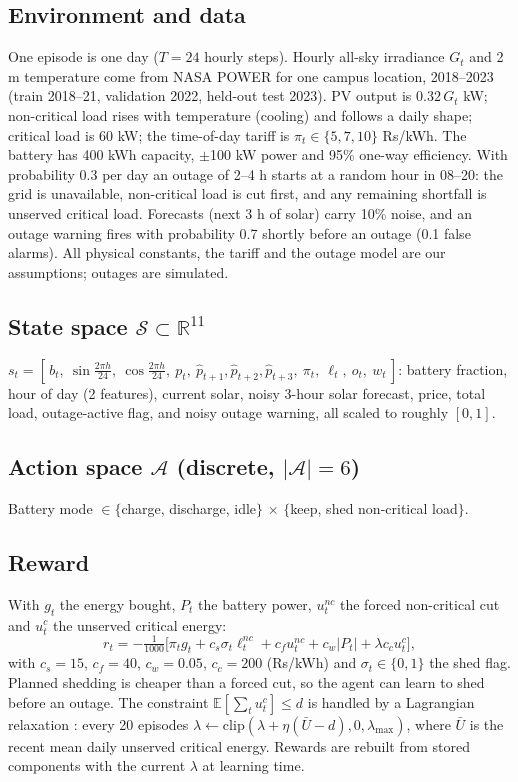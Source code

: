 ﻿\documentclass[10pt,twocolumn]{article}
\begin{document}
\subsection{Environment and data}
One episode is one day ($T{=}24$ hourly steps). Hourly all-sky irradiance $G_t$ and 2\,m temperature come from NASA POWER \cite{power} for one campus location, 2018--2023 (train 2018--21, validation 2022, held-out test 2023). PV output is $0.32\,G_t$ kW; non-critical load rises with temperature (cooling) and follows a daily shape; critical load is 60 kW; the time-of-day tariff is $\pi_t\in\{5,7,10\}$ Rs/kWh. The battery has 400 kWh capacity, $\pm$100 kW power and 95\% one-way efficiency. With probability 0.3 per day an outage of 2--4 h starts at a random hour in 08--20: the grid is unavailable, non-critical load is cut first, and any remaining shortfall is unserved critical load. Forecasts (next 3 h of solar) carry 10\% noise, and an outage warning fires with probability 0.7 shortly before an outage (0.1 false alarms). All physical constants, the tariff and the outage model are our assumptions; outages are simulated.

\subsection{State space $\mathcal S\subset\mathbb R^{11}$}
$s_t=[\,b_t,\ \sin\tfrac{2\pi h}{24},\ \cos\tfrac{2\pi h}{24},\ p_t,\ \hat p_{t+1},\hat p_{t+2},\hat p_{t+3},\ \pi_t,\ \ell_t,\ o_t,\ w_t\,]$: battery fraction, hour of day (2 features), current solar, noisy 3-hour solar forecast, price, total load, outage-active flag, and noisy outage warning, all scaled to roughly $[0,1]$.

\subsection{Action space $\mathcal A$ (discrete, $|\mathcal A|{=}6$)}
Battery mode $\in\{$charge, discharge, idle$\}$ $\times$ $\{$keep, shed non-critical load$\}$.

\subsection{Reward}
With $g_t$ the energy bought, $P_t$ the battery power, $u^{nc}_t$ the forced non-critical cut and $u^{c}_t$ the unserved critical energy:
\begin{equation}
r_t=-\tfrac{1}{1000}\big[\pi_t g_t + c_s\sigma_t \ell^{nc}_t + c_f u^{nc}_t + c_w|P_t| + \lambda c_c u^{c}_t\big],
\end{equation}
with $c_s{=}15$, $c_f{=}40$, $c_w{=}0.05$, $c_c{=}200$ (Rs/kWh) and $\sigma_t\in\{0,1\}$ the shed flag. Planned shedding is cheaper than a forced cut, so the agent can learn to shed before an outage. The constraint $\mathbb E[\sum_t u^c_t]\le d$ is handled by a Lagrangian relaxation \cite{cmdp}: every 20 episodes $\lambda\leftarrow\mathrm{clip}(\lambda+\eta(\bar U-d),0,\lambda_{\max})$, where $\bar U$ is the recent mean daily unserved critical energy. Rewards are rebuilt from stored components with the current $\lambda$ at learning time.
\end{document}

